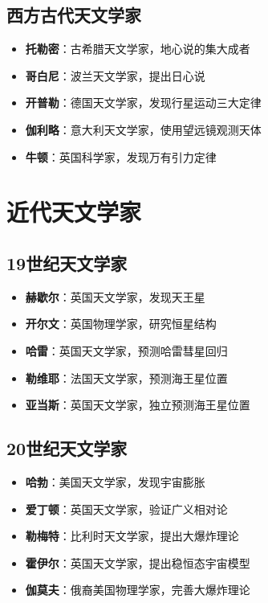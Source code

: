\documentclass[12pt,UTF8]{ctexbook}
\begin{document}
\section{西方古代天文学家}

\begin{itemize}
  \item \textbf{托勒密}：古希腊天文学家，地心说的集大成者
  \item \textbf{哥白尼}：波兰天文学家，提出日心说
  \item \textbf{开普勒}：德国天文学家，发现行星运动三大定律
  \item \textbf{伽利略}：意大利天文学家，使用望远镜观测天体
  \item \textbf{牛顿}：英国科学家，发现万有引力定律
\end{itemize}

\chapter{近代天文学家}
\section{19世纪天文学家}

\begin{itemize}
  \item \textbf{赫歇尔}：英国天文学家，发现天王星
  \item \textbf{开尔文}：英国物理学家，研究恒星结构
  \item \textbf{哈雷}：英国天文学家，预测哈雷彗星回归
  \item \textbf{勒维耶}：法国天文学家，预测海王星位置
  \item \textbf{亚当斯}：英国天文学家，独立预测海王星位置
\end{itemize}

\section{20世纪天文学家}

\begin{itemize}
  \item \textbf{哈勃}：美国天文学家，发现宇宙膨胀
  \item \textbf{爱丁顿}：英国天文学家，验证广义相对论
  \item \textbf{勒梅特}：比利时天文学家，提出大爆炸理论
  \item \textbf{霍伊尔}：英国天文学家，提出稳恒态宇宙模型
  \item \textbf{伽莫夫}：俄裔美国物理学家，完善大爆炸理论
\end{itemize}
\end{document}
